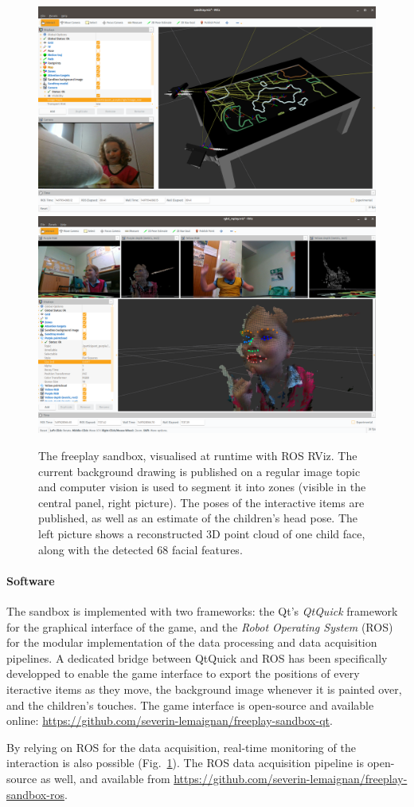 \documentclass{article}
\begin{document}
\begin{figure}[ht!]
    \centering
    \includegraphics[width=0.5\linewidth]{rviz-sandtray}
    \hspace{0.2em}
    \includegraphics[width=0.48\linewidth]{3d-point-cloud-facial-features}
    \caption{The freeplay sandbox, visualised at runtime with ROS RViz. The
    current background drawing is published on a regular image
    topic and computer vision is used to segment it into zones (visible in
    the central panel, right picture). The poses of the interactive items
    are published, as well as an estimate of the children's head pose.
    The left picture shows a reconstructed 3D point cloud of one child face,
    along with the detected 68 facial features.}
    \label{fig|rviz}
\end{figure}

\paragraph{Software}
The sandbox is implemented with two frameworks: the Qt's \emph{QtQuick} framework
for the graphical interface of the game, and the \emph{Robot Operating System}
(ROS) for the modular implementation of the data processing and data acquisition
pipelines. A dedicated bridge between QtQuick and ROS has been specifically
developped to enable the game interface to export the positions of every
iteractive items as they move, the background image whenever it is painted over,
and the children's touches. The game interface is open-source and available online:
\url{https://github.com/severin-lemaignan/freeplay-sandbox-qt}.

By relying on ROS for the data acquisition, real-time monitoring of the
interaction is also possible (Fig.~\ref{fig|rviz}).
The ROS data acquisition pipeline is open-source as well, and available from
\url{https://github.com/severin-lemaignan/freeplay-sandbox-ros}.
\end{document}

